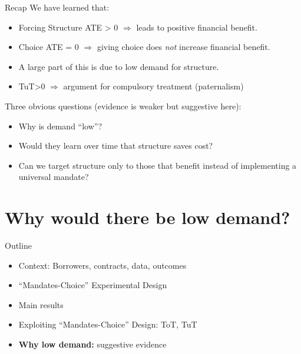 \documentclass[9pt, aspectratio=169]{beamer}
\begin{document}




\begin{frame}{Recap}
We have learned that:
\begin{itemize}
     \item Forcing Structure ATE > 0 $\Rightarrow$ leads to positive financial benefit. 
    \pause \vfill \item   Choice ATE = 0 $\Rightarrow$  giving choice does \textit{not} increase financial benefit. 
    \pause \vfill \item A large part of this is due to low demand for structure.
    \pause \vfill\item TuT>0 $\Rightarrow$ argument for compulsory treatment \alert{(paternalism)}
\end{itemize}
    \pause  \vfill Three obvious questions (evidence is weaker but suggestive here):
    \begin{itemize}
        \item Why is demand ``low''?
        \item Would they learn over time that structure saves cost? 
        \item Can we target structure only to those that benefit instead of implementing a universal mandate?
    \end{itemize}
\end{frame}


\section{Why would there be low demand?}

\begin{frame}{Outline}
     \large   
     \begin{itemize}
        \item Context: Borrowers, contracts, data, outcomes
         \item \vfill ``Mandates-Choice'' Experimental Design
         \vfill\item Main results
          \vfill\item Exploiting ``Mandates-Choice'' Design: ToT, TuT
         \vfill\item \textbf{Why low demand:} suggestive evidence
         
     \end{itemize}
\end{frame}
\end{document}
